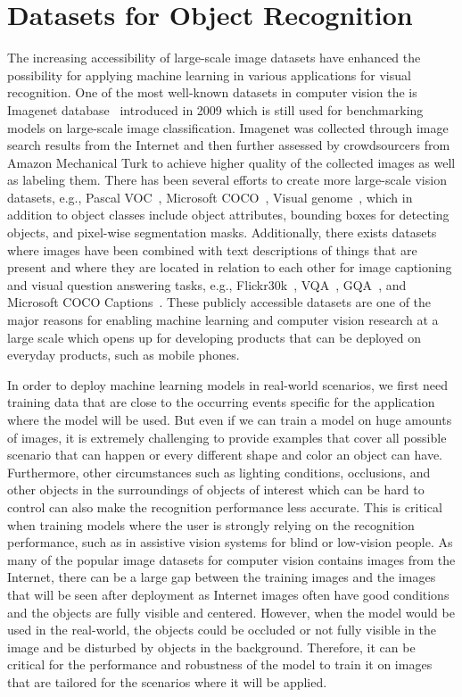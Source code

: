 
\section{Datasets for Object Recognition} %
\label{sec:datasets_for_object_recognition}

The increasing accessibility of large-scale image datasets have enhanced the possibility for applying machine learning in various applications for visual recognition. One of the most well-known datasets in computer vision the is Imagenet database~\cite{deng2009imagenet} introduced in 2009 which is still used for benchmarking models on large-scale image classification. Imagenet was collected through image search results from the Internet and then further assessed by crowdsourcers from Amazon Mechanical Turk to achieve higher quality of the collected images as well as labeling them. There has been several efforts to create more large-scale vision datasets, e.g., Pascal VOC~\cite{everingham2015pascal}, Microsoft COCO~\cite{lin2014microsoft}, Visual genome~\cite{krishna2017visual}, which in addition to object classes include object attributes, bounding boxes for detecting objects, and pixel-wise segmentation masks. Additionally, there exists datasets where images have been combined with text descriptions of things that are present and where they are located in relation to each other for image captioning and visual question answering tasks, e.g., Flickr30k~\cite{young2014image}, VQA~\cite{antol2015vqa}, GQA~\cite{hudson2019gqa}, and Microsoft COCO Captions~\cite{chen2015microsoft}. These publicly accessible datasets are one of the major reasons for enabling machine learning and computer vision research at a large scale which opens up for developing products that can be deployed on everyday products, such as mobile phones. 


In order to deploy machine learning models in real-world scenarios, we first need training data that are close to the occurring events specific for the application where the model will be used. 
But even if we can train a model on huge amounts of images, it is extremely challenging to provide examples that cover all possible scenario that can happen or every different shape and color an object can have. Furthermore, other circumstances such as lighting conditions, occlusions, and other objects in the surroundings of objects of interest which can be hard to control can also make the recognition performance less accurate. This is critical when training models where the user is strongly relying on the recognition performance, such as in assistive vision systems for blind or low-vision people. As many of the popular image datasets for computer vision contains images from the Internet, there can be a large gap between the training images and the images that will be seen after deployment as Internet images often have good conditions and the objects are fully visible and centered. However, when the model would be used in the real-world, the objects could be occluded or not fully visible in the image and be disturbed by objects in the background. Therefore, it can be critical for the performance and robustness of the model to train it on images that are tailored for the scenarios where it will be applied. 

